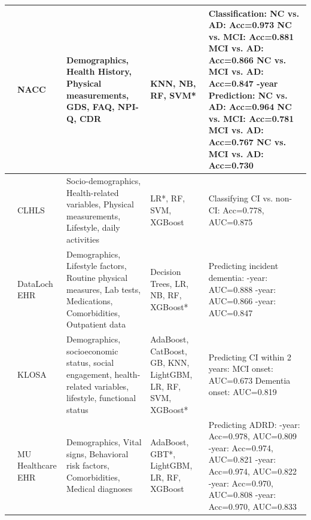 \begin{landscape}
\begin{longtable}{|M{0.15\textwidth}|M{0.15\textwidth}|M{0.4\textwidth}|M{0.3\textwidth}|M{0.5\textwidth}|}
\cite{abbas2024Explainable} & NACC & Demographics, Health History, Physical measurements, GDS, FAQ, \acrshort{NPI-Q}, CDR & KNN, \acrshort{NB}, RF, SVM* & Classification: \newline NC vs. AD: Acc=0.973 \newline NC vs. MCI: Acc=0.881 \newline MCI vs. AD: Acc=0.866 \newline NC vs. MCI vs. AD: Acc=0.847 -year Prediction: \newline NC vs. AD: Acc=0.964 \newline NC vs. MCI: Acc=0.781 \newline MCI vs. AD: Acc=0.767 \newline NC vs. MCI vs. AD: Acc=0.730 \\ 
\hline

\cite{Cui2024Prediction} & CLHLS & Socio-demographics, Health-related variables, Physical measurements, Lifestyle, daily activities & LR*, RF, SVM, XGBoost & Classifying CI vs. non-CI: Acc=0.778, AUC=0.875 \\ 
\hline

\cite{Georgiev2024Predicting} & DataLoch EHR & Demographics, Lifestyle factors, Routine physical measures, Lab tests, Medications, Comorbidities, Outpatient data & Decision Trees, LR, NB, RF, XGBoost* & Predicting incident dementia: -year: AUC=0.888 -year: AUC=0.866 -year: AUC=0.847 \\ 
\hline

\cite{Oh2024Multivariable} & KLOSA & Demographics, socioeconomic status, social engagement, health-related variables, lifestyle, functional status & AdaBoost, CatBoost, \acrshort{GB}, KNN, LightGBM, LR, RF, SVM, XGBoost* & Predicting CI within 2 years: \newline MCI onset: AUC=0.673 \newline Dementia onset: AUC=0.819 \\ 
\hline

\cite{Akter2025Using} & MU Healthcare EHR & Demographics, Vital signs, Behavioral risk factors, Comorbidities, Medical diagnoses & AdaBoost, GBT*, LightGBM, LR, RF, XGBoost & Predicting ADRD: -year: Acc=0.978, AUC=0.809 -year: Acc=0.974, AUC=0.821 -year: Acc=0.974, AUC=0.822 -year: Acc=0.970, AUC=0.808 -year: Acc=0.970, AUC=0.833 \\ 
\hline


\end{longtable}
\end{landscape}
